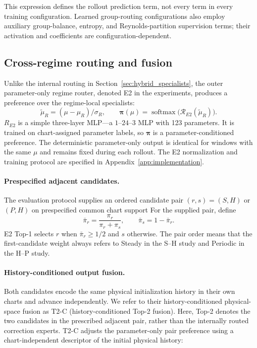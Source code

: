This expression defines the rollout prediction term, not every term in every training configuration. Learned group-routing configurations also employ auxiliary group-balance, entropy, and Reynolds-partition supervision terms; their activation and coefficients are configuration-dependent. 

\subsection{Cross-regime routing and fusion}
\label{sec:outer_routing}
Unlike the internal routing in Section~\ref{sec:hybrid_specialists}, the outer parameter-only regime router, denoted E2 in the experiments, produces a
preference over the regime-local specialists: 
\begin{equation}
  \widetilde\mu_R=(\mu-\mu_R)/\sigma_R,\qquad
  \bm\pi(\mu)=\operatorname{softmax}
  \bigl(\mathcal R_{E2}(\widetilde\mu_R)\bigr).
  \label{eq:main_e2_preference}
\end{equation}
\(R_{E2}\) is a simple three-layer MLP---a \(1\)--\(24\)--\(3\) MLP with 123 parameters. It is trained on chart-assigned parameter labels, so \(\bm\pi\) is a  parameter-conditioned preference. The deterministic parameter-only output is identical for windows with the same \(\mu\) and remains fixed during each rollout. The E2 normalization and training protocol are specified in Appendix~\ref{app:implementation}.

\paragraph{Prespecified adjacent candidates.}
The evaluation protocol supplies an ordered candidate pair $(r,s)=(S,H)$ or $(P,H)$ on prespecified common chart support
For the supplied pair, define
\begin{equation}
  \bar\pi_r=\frac{\pi_r}{\pi_r+\pi_s},\qquad
  \bar\pi_s=1-\bar\pi_r.
  \label{eq:main_pair_preference}
\end{equation}
E2 Top-1 selects $r$ when $\bar\pi_r\geq1/2$ and $s$ otherwise. The pair order means that the first-candidate weight always refers to Steady in the S--H study and Periodic in the H--P study.

\paragraph{History-conditioned output fusion.}

Both candidates encode the same physical initialization history
in their own charts and advance independently. We refer to their history-conditioned physical-space fusion as T2-C (history-conditioned Top-2 fusion).
Here, Top-2 denotes the two candidates in the prescribed adjacent
pair, rather than the internally routed correction experts. T2-C adjusts the parameter-only pair preference using a chart-independent descriptor of the initial physical history:

